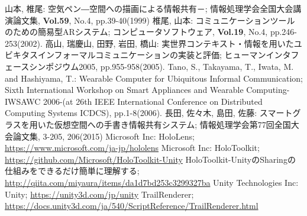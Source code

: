 \documentclass{hissymp}
\begin{document}
\begin{thebibliography}{99}
        山本, 椎尾:
        空気ペン―空間への描画による情報共有－;
        情報処理学会全国大会講演論文集,
        {\bf Vol.59}, No.4, pp.39-40(1999)
	椎尾, 山本:
	コミュニケーションツールのための簡易型ARシステム;
	コンピュータソフトウェア, 
        {\bf Vol.19}, No.4, pp.246-253(2002).
	高山, 瑞慶山, 田野, 岩田, 橋山:
	実世界コンテキスト・情報を用いたユビキタスインフォーマルコミュニケーションの実装と評価;
	ヒューマンインタフェースシンポジウム2005,
        pp.955-958(2005).
        Tano, S., Takayama, T., Iwata, M. and Hashiyama, T.:
        Wearable Computer for Ubiquitous Informal Communication;
        Sixth International Workshop on Smart Appliances and Wearable Computing-IWSAWC 2006-(at 26th IEEE International Conference on Distributed Computing Systems ICDCS),
        pp.1-8(2006).
        長田, 佐々木, 島田, 佐藤:
        スマートグラスを用いた仮想空間への手書き情報共有システム;
        情報処理学会第77回全国大会論文集,
        3-205, 206(2015)
        Microsoft Inc:
        HoloLens;
        \url{https://www.microsoft.com/ja-jp/hololens}
        Microsoft Inc:
        HoloToolkit;
        \url{https://github.com/Microsoft/HoloToolkit-Unity}
        HoloToolkit-UnityのSharingの仕組みをできるだけ簡単に理解する; 
        \url{http://qiita.com/miyaura/items/da1d7bd253c3299327ba}
        Unity Technologies Inc:
        Unity;
        \url{https://unity3d.com/jp/unity}
        TrailRenderer;
        \url{https://docs.unity3d.com/ja/540/ScriptReference/TrailRenderer.html}

\end{thebibliography}
\end{document}
